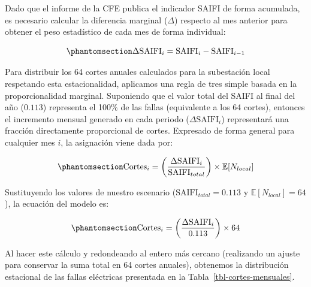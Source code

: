 \documentclass[
  spanish,
  us-letterpaper,
]{scrreprt}
\numberwithin{equation}{section}
\theoremstyle{plain}
\theoremstyle{plain}
\theoremstyle{plain}
\theoremstyle{definition}
\theoremstyle{remark}
\begin{document}
Dado que el informe de la CFE publica el indicador SAIFI de forma
acumulada, es necesario calcular la diferencia marginal (\(\Delta\))
respecto al mes anterior para obtener el peso estadístico de cada mes de
forma individual:

\begin{equation}\phantomsection\label{eq-delta-saifi}{
\Delta \text{SAIFI}_i = \text{SAIFI}_i - \text{SAIFI}_{i-1}
}\end{equation}

Para distribuir los 64 cortes anuales calculados para la subestación
local respetando esta estacionalidad, aplicamos una regla de tres simple
basada en la proporcionalidad marginal. Suponiendo que el valor total
del SAIFI al final del año (\(0.113\)) representa el 100\% de las fallas
(equivalente a los 64 cortes), entonces el incremento mensual generado
en cada periodo (\(\Delta \text{SAIFI}_i\)) representará una fracción
directamente proporcional de cortes. Expresado de forma general para
cualquier mes \(i\), la asignación viene dada por:

\begin{equation}\phantomsection\label{eq-reparto-cortes}{
\text{Cortes}_i = \left( \frac{\Delta \text{SAIFI}_i}{\text{SAIFI}_{total}} \right) \times \mathbb{E}[N_{local}]
}\end{equation}

Sustituyendo los valores de nuestro escenario
(\(\text{SAIFI}_{total} = 0.113\) y \(\mathbb{E}[N_{local}] = 64\)), la
ecuación del modelo es:

\begin{equation}\phantomsection\label{eq-modelo-cortes}{
\text{Cortes}_i = \left( \frac{\Delta \text{SAIFI}_i}{0.113} \right) \times 64
}\end{equation}

Al hacer este cálculo y redondeando al entero más cercano (realizando un
ajuste para conservar la suma total en 64 cortes anuales), obtenemos la
distribución estacional de las fallas eléctricas presentada en la
Tabla~\ref{tbl-cortes-mensuales}.
\end{document}

